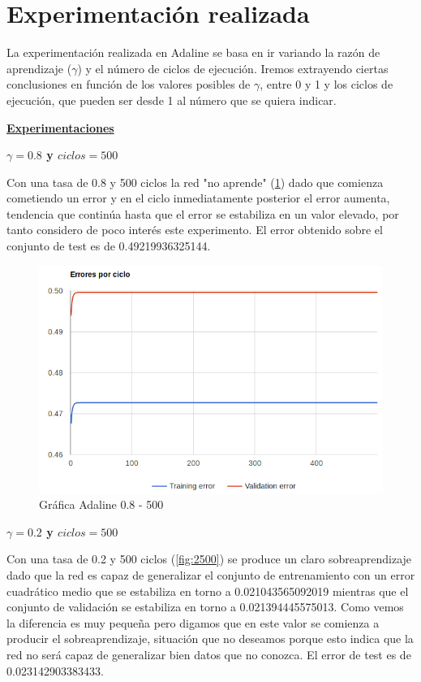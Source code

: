 \documentclass[11pt,spanish,listoffigures,listoftables]{workluis}
\begin{document}
\section{Experimentación realizada}

\par La experimentación realizada en Adaline se basa en ir variando la razón de aprendizaje ($\gamma$) y el número de ciclos de ejecución. Iremos extrayendo ciertas conclusiones en función de los valores posibles de $\gamma$, entre 0 y 1 y los ciclos de ejecución, que pueden ser desde 1 al número que se quiera indicar.

\par \underline{\textbf{Experimentaciones}}

\par \textbf{$\gamma = 0.8$ y $ciclos = 500$}

\par Con una tasa de 0.8 y 500 ciclos la red "no aprende" (\ref{fig:8500}) dado que comienza cometiendo un error y en el ciclo inmediatamente posterior el error aumenta, tendencia que continúa hasta que el error se estabiliza en un valor elevado, por tanto considero de poco interés este experimento. El error obtenido sobre el conjunto de test es de 0.49219936325144.

\begin{figure}[H]
\centering
\includegraphics[scale=0.5]{8500}
\caption{Gráfica Adaline 0.8 - 500}\label{fig:8500}
\end{figure}

\par \textbf{$\gamma = 0.2$ y $ciclos = 500$}

\par Con una tasa de 0.2 y 500 ciclos (\ref{fig:2500}) se produce un claro sobreaprendizaje dado que la red es capaz de generalizar el conjunto de entrenamiento con un error cuadrático medio que se estabiliza en torno a 0.021043565092019 mientras que el conjunto de validación se estabiliza en torno a 0.021394445575013. Como vemos la diferencia es muy pequeña pero digamos que en este valor se comienza a producir el sobreaprendizaje, situación que no deseamos porque esto indica que la red no será capaz de generalizar bien datos que no conozca. El error de test es de 0.023142903383433.
\end{document}
